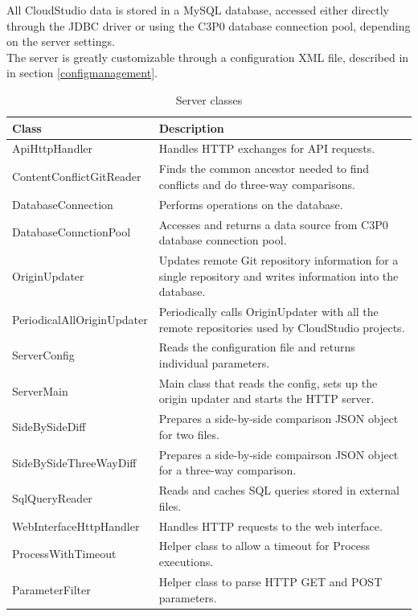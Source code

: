 All CloudStudio data is stored in a MySQL database, accessed either directly through the JDBC driver or using the C3P0 database connection pool, depending on the server settings. \\

The server is greatly customizable through a configuration XML file, described in in section \ref{configmanagement}.


\begin{table}

    \scriptsize
    \begin{tabularx}{\textwidth}{ | l | X | }
    \hline
\textbf{Class} & \textbf{Description} \\ \hline
ApiHttpHandler & Handles HTTP exchanges for API requests. \\ \hline
ContentConflictGitReader & Finds the common ancestor needed to find conflicts and do three-way comparisons. \\ \hline
DatabaseConnection & Performs operations on the database. \\ \hline
DatabaseConnctionPool & Accesses and returns a data source from C3P0 database connection pool. \\ \hline
OriginUpdater & Updates remote Git repository information for a single repository and writes information into the database. \\ \hline
PeriodicalAllOriginUpdater & Periodically calls OriginUpdater with all the remote repositories used by CloudStudio projects. \\ \hline
ServerConfig & Reads the configuration file and returns individual parameters. \\ \hline
ServerMain & Main class that reads the config, sets up the origin updater and starts the HTTP server. \\ \hline
SideBySideDiff & Prepares a side-by-side comparison JSON object for two files. \\ \hline
SideBySideThreeWayDiff & Prepares a side-by-side compairson JSON object for a three-way comparison. \\ \hline
SqlQueryReader & Reads and caches SQL queries stored in external files. \\ \hline
WebInterfaceHttpHandler & Handles HTTP requests to the web interface. \\ \hline
ProcessWithTimeout & Helper class to allow a timeout for Process executions. \\ \hline
ParameterFilter & Helper class to parse HTTP GET and POST parameters. \\ \hline
    \end{tabularx}
    
    \centering
  \caption{Server classes}
  \label{table:serverclasses}
\end{table}



